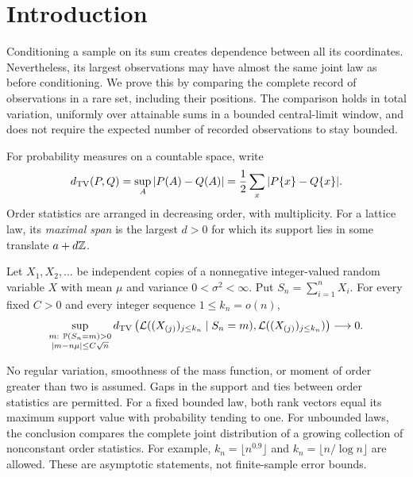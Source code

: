 \section{Introduction}
Conditioning a sample on its sum creates dependence between all its coordinates. Nevertheless, its largest observations may have almost the same joint law as before conditioning. We prove this by comparing the complete record of observations in a rare set, including their positions. The comparison holds in total variation, uniformly over attainable sums in a bounded central-limit window, and does not require the expected number of recorded observations to stay bounded.

For probability measures on a countable space, write
\begin{equation}\label{eq:tv}
 d_{\mathrm{TV}}(P,Q)=\sup_A|P(A)-Q(A)|=\frac12\sum_x|P\{x\}-Q\{x\}|.
\end{equation}
Order statistics are arranged in decreasing order, with multiplicity. For a lattice law, its \emph{maximal span} is the largest $d>0$ for which its support lies in some translate $a+d\mathbb Z$.

\begin{theorem}\label{thm:lead}
Let $X_1,X_2,\ldots$ be independent copies of a nonnegative integer-valued random variable $X$ with mean $\mu$ and variance $0<\sigma^2<\infty$. Put $S_n=\sum_{i=1}^nX_i$. For every fixed $C>0$ and every integer sequence $1\le k_n=o(n)$,
\begin{equation}\label{eq:lead}
 \sup_{\substack{m:\ \mathbb P(S_n=m)>0\\ |m-n\mu|\le C\sqrt n}}
 d_{\mathrm{TV}}\left(\mathcal L((X_{(j)})_{j\le k_n}\mid S_n=m),
               \mathcal L((X_{(j)})_{j\le k_n})\right)\longrightarrow0.
\end{equation}
\end{theorem}
No regular variation, smoothness of the mass function, or moment of order greater than two is assumed. Gaps in the support and ties between order statistics are permitted. For a fixed bounded law, both rank vectors equal its maximum support value with probability tending to one. For unbounded laws, the conclusion compares the complete joint distribution of a growing collection of nonconstant order statistics. For example, $k_n=\lfloor n^{0.9}\rfloor$ and $k_n=\lfloor n/\log n\rfloor$ are allowed. These are asymptotic statements, not finite-sample error bounds.

